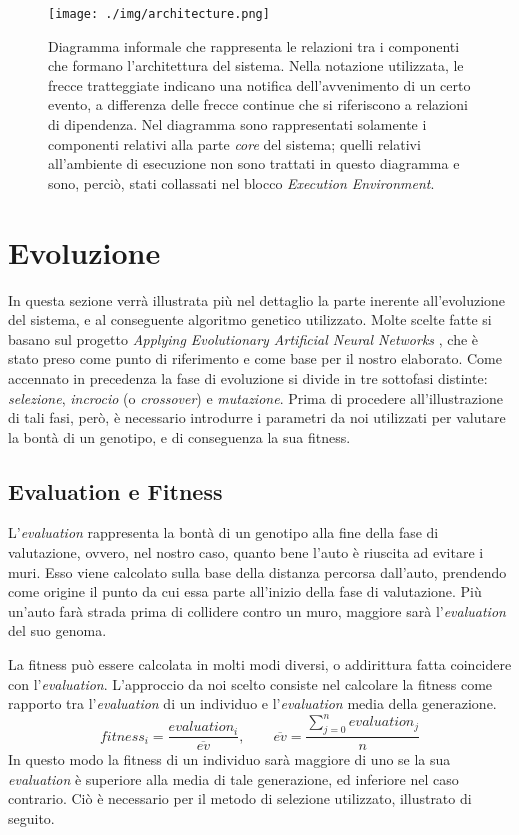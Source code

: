\documentclass[a4paper,12pt]{article}
\begin{document}
\begin{figure}[H]
	\centering
	\texttt{[image: ./img/architecture.png]}
	\caption{Diagramma informale che rappresenta le relazioni tra i componenti che formano l'architettura del sistema. Nella notazione utilizzata, le frecce tratteggiate indicano una notifica dell'avvenimento di un certo evento, a differenza delle frecce continue che si riferiscono a relazioni di dipendenza. Nel diagramma sono rappresentati solamente i componenti relativi alla parte \emph{core} del sistema; quelli relativi all'ambiente di esecuzione non sono trattati in questo diagramma e sono, perciò, stati collassati nel blocco \emph{Execution Environment}.  \label{architecture-diagram}}
\end{figure}

\section{Evoluzione} \label{evolution}
In questa sezione verrà illustrata più nel dettaglio la parte inerente all'evoluzione del sistema, e al conseguente algoritmo genetico utilizzato. Molte scelte fatte si basano sul progetto \emph{Applying Evolutionary Artificial Neural Networks} \cite{arztRepo}, che è stato preso come punto di riferimento e come base per il nostro elaborato. Come accennato in precedenza la fase di evoluzione si divide in tre sottofasi distinte: \emph{selezione}, \emph{incrocio} (o \emph{crossover}) e \emph{mutazione}. Prima di procedere all'illustrazione di tali fasi, però, è necessario introdurre i parametri da noi utilizzati per valutare la bontà di un genotipo, e di conseguenza la sua fitness.
\subsection*{Evaluation e Fitness} \label{evFitness}
L'\emph{evaluation} rappresenta la bontà di un genotipo alla fine della fase di valutazione, ovvero, nel nostro caso, quanto bene l'auto è riuscita ad evitare i muri. Esso viene calcolato sulla base della distanza percorsa dall'auto, prendendo come origine il punto da cui essa parte all'inizio della fase di valutazione. Più un'auto farà strada prima di collidere contro un muro, maggiore sarà l'\emph{evaluation} del suo genoma. 

La fitness può essere calcolata in molti modi diversi, o addirittura fatta coincidere con l'\emph{evaluation}. L'approccio da noi scelto consiste nel calcolare la fitness come rapporto tra l'\emph{evaluation} di un individuo e l'\emph{evaluation} media della generazione. 
\begin{equation}
	fitness_i = \frac{evaluation_i}{\overline{ev}}, \hspace{2em} \overline{ev} = \frac{\sum_{j = 0}^{n} evaluation_j }{n}
\end{equation}
In questo modo la fitness di un individuo sarà maggiore di uno se la sua \emph{evaluation} è superiore alla media di tale generazione, ed inferiore nel caso contrario. Ciò è necessario per il metodo di selezione utilizzato, illustrato di seguito.
\end{document}
